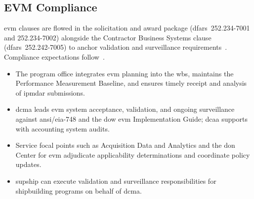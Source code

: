 \documentclass[../main.tex]{subfiles}
\begin{document}
\subsection{EVM Compliance}
\ac{evm} clauses are flowed in the solicitation and award package (\ac{dfars}~252.234-7001 and 252.234-7002) alongside the Contractor Business Systems clause (\ac{dfars}~252.242-7005) to anchor validation and surveillance requirements~\autocite{DFARS}. Compliance expectations follow~\autocite{edo-3-6-1-evm-intro-2025,DoDI5000-85}.
\begin{itemize}
  \item The program office integrates \ac{evm} planning into the \ac{wbs}, maintains the Performance Measurement Baseline, and ensures timely receipt and analysis of \ac{ipmdar} submissions.
  \item \ac{dcma} leads \ac{evm} system acceptance, validation, and ongoing surveillance against \ac{ansi}/\ac{eia}-748 and the \ac{dow} \ac{evm} Implementation Guide; \ac{dcaa} supports with accounting system audits.
  \item Service focal points such as Acquisition Data and Analytics and the \ac{don} Center for \ac{evm} adjudicate applicability determinations and coordinate policy updates.
  \item \ac{supship} can execute validation and surveillance responsibilities for shipbuilding programs on behalf of \ac{dcma}.
\end{itemize}
\end{document}
